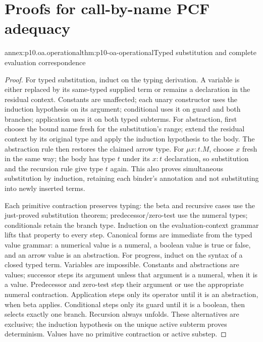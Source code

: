\section{Proofs for call-by-name PCF adequacy}
\label{annex:p10-operational-adequacy-domain-models}

\begin{annexitem}{annex:p10.oa.operational}{thm:p10-oa-operational}{Typed substitution and complete evaluation correspondence}
\begin{proof}
For typed substitution, induct on the typing derivation. A variable is
either replaced by its same-typed supplied term or remains a declaration
in the residual context. Constants are unaffected; each unary constructor
uses the induction hypothesis on its argument; conditional uses it on
guard and both branches; application uses it on both typed subterms.
For abstraction, first choose the bound name fresh for the substitution's
range; extend the residual context by its original type and apply the
induction hypothesis to the body. The abstraction rule then restores
the claimed arrow type. For \(\mu x:t.M\), choose \(x\) fresh in
the same way; the body has type \(t\) under its \(x:t\) declaration,
so substitution and the recursion rule give type \(t\) again.
This also proves simultaneous substitution by induction, retaining each
binder's annotation and not substituting into newly inserted terms.

Each primitive contraction preserves typing: the beta and recursive
cases use the just-proved substitution theorem; predecessor/zero-test
use the numeral types; conditionals retain the branch type. Induction
on the evaluation-context grammar lifts that property to every step.
Canonical forms are immediate from the typed value grammar: a numerical
value is a numeral, a boolean value is true or false, and an arrow value
is an abstraction. For progress, induct on the syntax of a closed typed
term. Variables are impossible. Constants and abstractions are values;
successor steps its argument unless that argument is a numeral, when it
is a value. Predecessor and zero-test step their argument or use the
appropriate numeral contraction. Application steps only its operator
until it is an abstraction, when beta applies. Conditional steps only
its guard until it is a boolean, then selects exactly one branch.
Recursion always unfolds. These alternatives are exclusive; the induction
hypothesis on the unique active subterm proves determinism. Values have
no primitive contraction or active substep.


\end{proof}
\end{annexitem}
